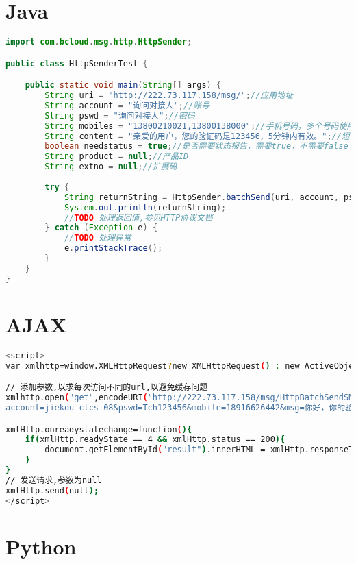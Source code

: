 \documentclass[11pt]{book} %
\begin{document}
\section{Java}

\begin{lstlisting}[language=Java]
import com.bcloud.msg.http.HttpSender;

public class HttpSenderTest {

	public static void main(String[] args) {
		String uri = "http://222.73.117.158/msg/";//应用地址
		String account = "询问对接人";//账号
		String pswd = "询问对接人";//密码
		String mobiles = "13800210021,13800138000";//手机号码，多个号码使用","分割
		String content = "亲爱的用户，您的验证码是123456，5分钟内有效。";//短信内容
		boolean needstatus = true;//是否需要状态报告，需要true，不需要false
		String product = null;//产品ID
		String extno = null;//扩展码
		 
		try {
			String returnString = HttpSender.batchSend(uri, account, pswd, mobiles, content, needstatus, product, extno);
			System.out.println(returnString);
			//TODO 处理返回值,参见HTTP协议文档
		} catch (Exception e) {
			//TODO 处理异常
			e.printStackTrace();
		}
	}
}
\end{lstlisting}


\section{AJAX}


\begin{lstlisting}[language=bash]
<script>
var xmlhttp=window.XMLHttpRequest?new XMLHttpRequest() : new ActiveObject("Microsoft.XMLHttp");

// 添加参数,以求每次访问不同的url,以避免缓存问题
xmlhttp.open("get",encodeURI("http://222.73.117.158/msg/HttpBatchSendSM?
account=jiekou-clcs-08&pswd=Tch123456&mobile=18916626442&msg=你好，你的验证码是：1234"));

xmlHttp.onreadystatechange=function(){
	if(xmlHttp.readyState == 4 && xmlHttp.status == 200){
		document.getElementById("result").innerHTML = xmlHttp.responseText;
	}
}
// 发送请求,参数为null
xmlHttp.send(null);
</script>
\end{lstlisting}


\section{Python}

\begin{lstlisting}[language=Python]

\end{lstlisting}
\end{document}
